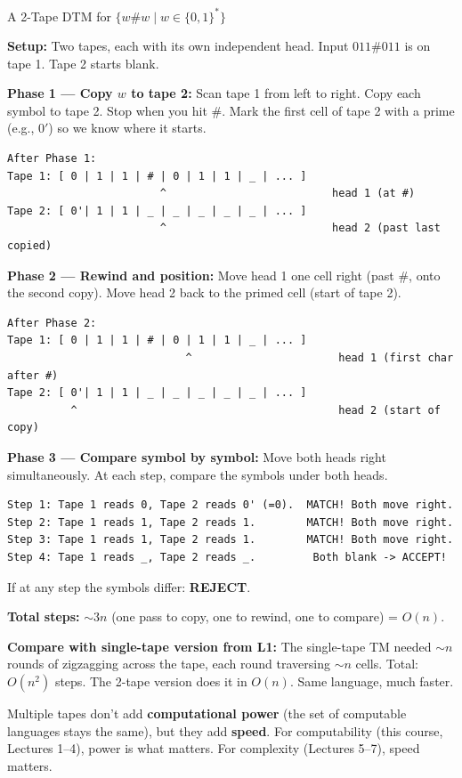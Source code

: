 \documentclass[11pt,a4paper]{article}
\newcommand{\kt}[1]{\par\vspace{0.3em}\colorbox{yellow!60}{\parbox{\dimexpr\linewidth-2\fboxsep}{#1}}\vspace{0.3em}}
\begin{document}
\begin{examplebox}{A 2-Tape DTM for $\{w\#w \mid w \in \{0,1\}^*\}$}

\textbf{Setup:} Two tapes, each with its own independent head. Input $011\#011$ is on tape 1. Tape 2 starts blank.

\textbf{Phase 1 --- Copy $w$ to tape 2:} Scan tape 1 from left to right. Copy each symbol to tape 2. Stop when you hit \#. Mark the first cell of tape 2 with a prime (e.g., $0'$) so we know where it starts.
\begin{lstlisting}
After Phase 1:
Tape 1: [ 0 | 1 | 1 | # | 0 | 1 | 1 | _ | ... ]
                        ^                          head 1 (at #)
Tape 2: [ 0'| 1 | 1 | _ | _ | _ | _ | _ | ... ]
                        ^                          head 2 (past last copied)
\end{lstlisting}

\textbf{Phase 2 --- Rewind and position:} Move head 1 one cell right (past \#, onto the second copy). Move head 2 back to the primed cell (start of tape 2).
\begin{lstlisting}
After Phase 2:
Tape 1: [ 0 | 1 | 1 | # | 0 | 1 | 1 | _ | ... ]
                            ^                       head 1 (first char after #)
Tape 2: [ 0'| 1 | 1 | _ | _ | _ | _ | _ | ... ]
          ^                                         head 2 (start of copy)
\end{lstlisting}

\textbf{Phase 3 --- Compare symbol by symbol:} Move both heads right simultaneously. At each step, compare the symbols under both heads.
\begin{lstlisting}
Step 1: Tape 1 reads 0, Tape 2 reads 0' (=0).  MATCH! Both move right.
Step 2: Tape 1 reads 1, Tape 2 reads 1.        MATCH! Both move right.
Step 3: Tape 1 reads 1, Tape 2 reads 1.        MATCH! Both move right.
Step 4: Tape 1 reads _, Tape 2 reads _.         Both blank -> ACCEPT!
\end{lstlisting}

If at any step the symbols differ: \textbf{REJECT}.

\textbf{Total steps:} $\sim 3n$ (one pass to copy, one to rewind, one to compare) = $O(n)$.

\textbf{Compare with single-tape version from L1:} The single-tape TM needed $\sim n$ rounds of zigzagging across the tape, each round traversing $\sim n$ cells. Total: $O(n^2)$ steps. The 2-tape version does it in $O(n)$. Same language, much faster.

\kt{Multiple tapes don't add \textbf{computational power} (the set of computable languages stays the same), but they add \textbf{speed}. For computability (this course, Lectures 1--4), power is what matters. For complexity (Lectures 5--7), speed matters.}
\end{examplebox}
\end{document}
